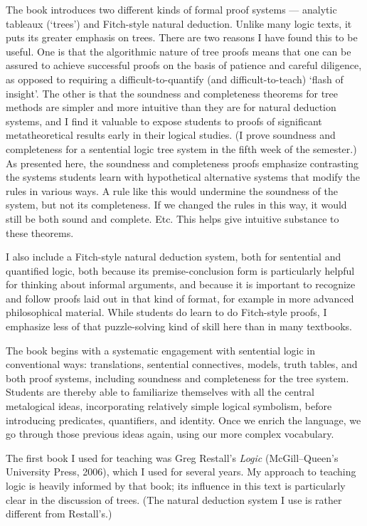 The book introduces two different kinds of formal proof systems --- analytic tableaux (`trees') and Fitch-style natural deduction. Unlike many logic texts, it puts its greater emphasis on trees. There are two reasons I have found this to be useful. One is that the algorithmic nature of tree proofs means that one can be assured to achieve successful proofs on the basis of patience and careful diligence, as opposed to requiring a difficult-to-quantify (and difficult-to-teach) `flash of insight'. The other is that the soundness and completeness theorems for tree methods are simpler and more intuitive than they are for natural deduction systems, and I find it valuable to expose students to proofs of significant metatheoretical results early in their logical studies. (I prove soundness and completeness for a sentential logic tree system in the fifth week of the semester.) As presented here, the soundness and completeness proofs emphasize contrasting the systems students learn with hypothetical alternative systems that modify the rules in various ways. A rule like this would undermine the soundness of the system, but not its completeness. If we changed the rules in this way, it would still be both sound and complete. Etc. This helps give intuitive substance to these theorems.

I also include a Fitch-style natural deduction system, both for sentential and quantified logic, both because its premise-conclusion form is particularly helpful for thinking about informal arguments, and because it is important to recognize and follow proofs laid out in that kind of format, for example in more advanced philosophical material. While students do learn to do Fitch-style proofs, I emphasize less of that puzzle-solving kind of skill here than in many textbooks.

The book begins with a systematic engagement with sentential logic in conventional ways: translations, sentential connectives, models, truth tables, and both proof systems, including soundness and completeness for the tree system. Students are thereby able to familiarize themselves with all the central metalogical ideas, incorporating relatively simple logical symbolism, before introducing predicates, quantifiers, and identity. Once we enrich the language, we go through those previous ideas again, using our more complex vocabulary.

The first book I used for teaching was Greg Restall's \emph{Logic} (McGill--Queen's University Press, 2006), which I used for several years. My approach to teaching logic is heavily informed by that book; its influence in this text is particularly clear in the discussion of trees. (The natural deduction system I use is rather different from Restall's.)

